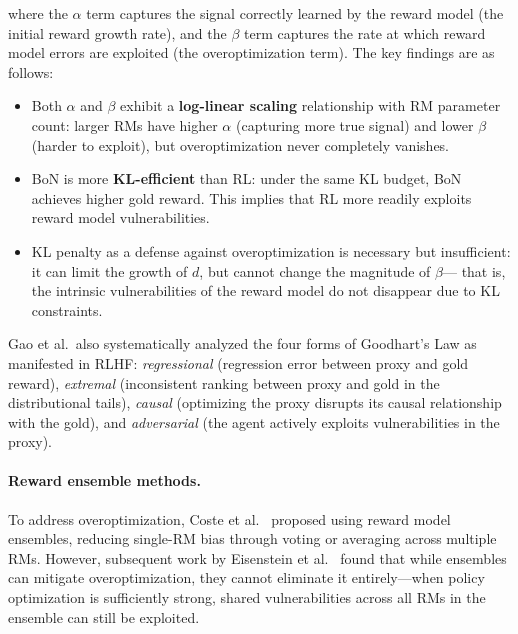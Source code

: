 \noindent
where the $\alpha$ term captures the signal correctly learned by the reward model (the initial reward growth rate),
and the $\beta$ term captures the rate at which reward model errors are exploited (the overoptimization term).
The key findings are as follows:

\begin{itemize}[leftmargin=2em]
  \item Both $\alpha$ and $\beta$ exhibit a \textbf{log-linear scaling} relationship with RM parameter count:
    larger RMs have higher $\alpha$ (capturing more true signal) and lower $\beta$ (harder to exploit),
    but overoptimization never completely vanishes.
  \item BoN is more \textbf{KL-efficient} than RL:
    under the same KL budget, BoN achieves higher gold reward.
    This implies that RL more readily exploits reward model vulnerabilities.
  \item KL penalty as a defense against overoptimization is necessary but insufficient:
    it can limit the growth of $d$, but cannot change the magnitude of $\beta$---
    that is, the intrinsic vulnerabilities of the reward model do not disappear due to KL constraints.
\end{itemize}

Gao et al.\ also systematically analyzed the four forms of Goodhart's Law as manifested in RLHF:
\textit{regressional} (regression error between proxy and gold reward),
\textit{extremal} (inconsistent ranking between proxy and gold in the distributional tails),
\textit{causal} (optimizing the proxy disrupts its causal relationship with the gold),
and \textit{adversarial} (the agent actively exploits vulnerabilities in the proxy).

\paragraph{Reward ensemble methods.}
To address overoptimization,
Coste et al.\ \cite{coste2023ensemble} proposed using reward model ensembles,
reducing single-RM bias through voting or averaging across multiple RMs.
However, subsequent work by Eisenstein et al.\ \cite{eisenstein2023ensemble} found that
while ensembles can mitigate overoptimization,
they cannot eliminate it entirely---when policy optimization is sufficiently strong,
shared vulnerabilities across all RMs in the ensemble can still be exploited.

